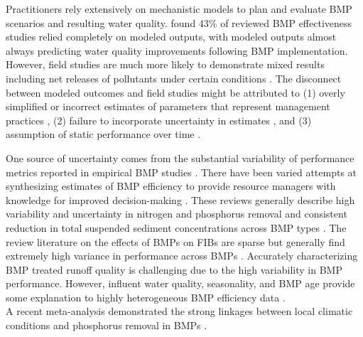 \documentclass[utf8]{FrontiersinHarvard}
\begin{document}
Practitioners rely extensively on mechanistic models to plan and evaluate BMP scenarios and resulting water quality.
\citet{linternBestManagementPractices2020} found 43\% of reviewed BMP effectiveness studies relied completely on modeled outputs, with modeled outputs almost always predicting water quality improvements following BMP implementation.
However, field studies are much more likely to demonstrate mixed results including net releases of pollutants under certain conditions \citep{linternBestManagementPractices2020, liuReviewEffectivenessBest2017}.
The disconnect between modeled outcomes and field studies might be attributed to (1) overly simplified or incorrect estimates of parameters that represent management practices \citep{ullrichApplicationSoilWater2009, fuReviewCatchmentscaleWater2019, linternBestManagementPractices2020}, (2) failure to incorporate uncertainty in estimates \citep{tasdighiBayesianTotalUncertainty2018, fuReviewCatchmentscaleWater2019, linternBestManagementPractices2020}, and (3) assumption of static performance over time \citep{mealsLagTimeWater2010, liuReviewEffectivenessBest2017, fuReviewCatchmentscaleWater2019}.

One source of uncertainty comes from the substantial variability of performance metrics reported in empirical BMP studies \citep{linternBestManagementPractices2020}.
There have been varied attempts at synthesizing estimates of BMP efficiency to provide resource managers with knowledge for improved decision-making \citep{agouridisLivestockGrazingManagement2005, barrettComparisonBMPPerformance2008, claryBMPPerformanceAnalysis2011, grudzinskiDoesRiparianFencing2020, horvathEffectsRegionalClimate2023, kochNitrogenRemovalStormwater2014, krogerReviewBestManagement2012, liuReviewEffectivenessBest2017, simpsonDevelopingBestManagement2009}.
These reviews generally describe high variability and uncertainty in nitrogen and phosphorus removal and consistent reduction in total suspended sediment concentrations across BMP types \citep{linternBestManagementPractices2020, liuReviewEffectivenessBest2017, kochNitrogenRemovalStormwater2014, claryBMPPerformanceAnalysis2011, barrettComparisonBMPPerformance2008, grudzinskiDoesRiparianFencing2020}.
The review literature on the effects of BMPs on FIBs are sparse but generally find extremely high variance in performance across BMPs \citep{claryBMPPerformanceAnalysis2011, grudzinskiDoesRiparianFencing2020}.
Accurately characterizing BMP treated runoff quality is challenging due to the high variability in BMP performance.
However, influent water quality, seasonality, and BMP age provide some explanation to highly heterogeneous BMP efficiency data \citep{barrettPerformanceComparisonStructural2005, liuReviewEffectivenessBest2017}.\\
A recent meta-analysis demonstrated the strong linkages between local climatic conditions and phosphorus removal in BMPs \citep{horvathEffectsRegionalClimate2023}.
\end{document}
